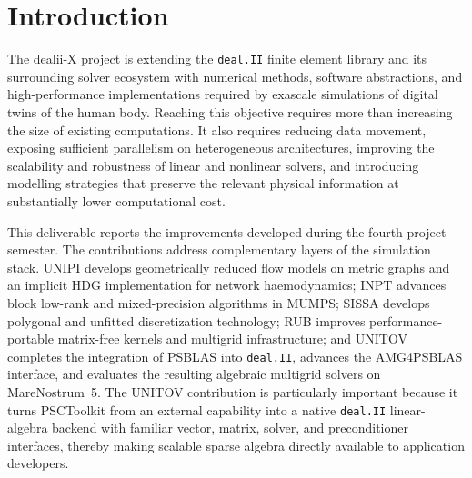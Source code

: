 \documentclass[a4paper,12pt]{article}
\begin{document}
\vspace*{2cm}

\disclaimer

\newpage

\tableofcontents %

\newpage

\section{Introduction}

The dealii-X project is extending the \texttt{deal.II} finite element library and its surrounding solver ecosystem with numerical methods, software abstractions, and high-performance implementations required by exascale simulations of digital twins of the human body. Reaching this objective requires more than increasing the size of existing computations. It also requires reducing data movement, exposing sufficient parallelism on heterogeneous architectures, improving the scalability and robustness of linear and nonlinear solvers, and introducing modelling strategies that preserve the relevant physical information at substantially lower computational cost.

This deliverable reports the improvements developed during the fourth project semester. The contributions address complementary layers of the simulation stack. UNIPI develops geometrically reduced flow models on metric graphs and an implicit HDG implementation for network haemodynamics; INPT advances block low-rank and mixed-precision algorithms in MUMPS; SISSA develops polygonal and unfitted discretization technology; RUB improves performance-portable matrix-free kernels and multigrid infrastructure; and UNITOV completes the integration of PSBLAS into \texttt{deal.II}, advances the AMG4PSBLAS interface, and evaluates the resulting algebraic multigrid solvers on MareNostrum~5. The UNITOV contribution is particularly important because it turns PSCToolkit from an external capability into a native \texttt{deal.II} linear-algebra backend with familiar vector, matrix, solver, and preconditioner interfaces, thereby making scalable sparse algebra directly available to application developers.
\end{document}
